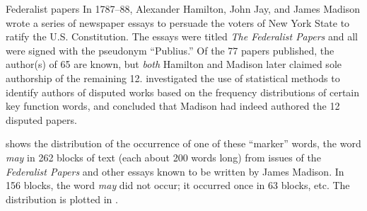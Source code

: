 \begin{Example}[madison1]{Federalist papers}
In 1787--88, Alexander Hamilton, John Jay, and James Madison
wrote a series of newspaper essays to persuade the voters of
New York State to ratify the U.S. Constitution.
The essays were titled \emph{The Federalist Papers}
and all were signed with the pseudonym ``Publius.''  Of the 77 papers published,
the author(s) of 65 are known, but \emph{both}
Hamilton and Madison later claimed sole authorship of the remaining 12.
\citet{MostellerWallace:84}
investigated the use of statistical methods to identify authors of
disputed works based on the frequency distributions of certain key
function words, and concluded that Madison had indeed authored the
12 disputed papers.  

 shows the distribution of the occurrence of one of
these ``marker'' words, 
the
word \emph{may} in 262 blocks of text (each about 200 words long)
from issues of the \emph{Federalist Papers} and other essays known
to be written by James Madison.  In 156 blocks, the word \emph{may}
did not occur; it occurred once in 63 blocks, etc.  The distribution
is plotted in .




\end{Example}
